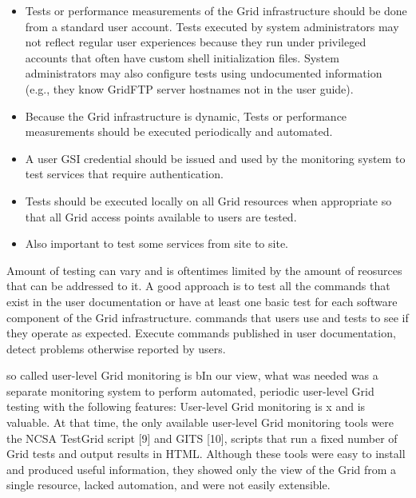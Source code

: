 \documentclass[times, 10pt,twocolumn]{article}
\begin{document}
\begin{itemize}

\item Tests or performance measurements of the Grid infrastructure should be
done from a standard user account.  Tests executed by system administrators may
not reflect regular user experiences because they run under privileged
accounts that often have custom shell initialization files.
System administrators may also configure tests using undocumented information
(e.g., they know GridFTP server hostnames not in the user guide).  

\item Because the Grid infrastructure is dynamic, Tests or performance
measurements should be executed periodically and automated.

\item A user GSI credential should be issued and
used by the monitoring system to test services that require authentication.  

\item Tests should be executed locally on all Grid resources when appropriate
so that all Grid access points available to users are tested.  

\item Also important to test some services from site to site.
\end{itemize}
Amount of testing can vary and is oftentimes limited by the amount of
reosurces that can be addressed to it.  A good approach is to test all the
commands that exist in the user documentation or have at least one basic test
for each software component of the Grid infrastructure.  
commands that users use and tests to see if they operate as expected. Execute
commands published in user
documentation, detect problems otherwise reported by users.

so called user-level Grid monitoring is bIn our view, what was
needed was a separate
monitoring system to perform automated, periodic user-level Grid testing with
the following features:
User-level Grid monitoring is x and is valuable.  
At that
time, the only available user-level Grid monitoring tools were the NCSA
TestGrid script [9] and GITS [10], scripts that run a fixed number of Grid
tests and output results in HTML.  Although these tools were easy to install
and produced useful information, they showed only the view of the Grid from a
single resource, lacked automation, and were not easily extensible.  
\end{document}
